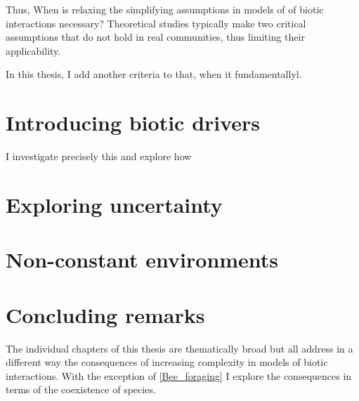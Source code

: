 \begin{refsection}
Thus, When is relaxing the simplifying assumptions in models of  of biotic interactions necessary? Theoretical studies typically make two critical assumptions that do not hold in real communities, thus limiting their applicability.


In this thesis, I add another criteria to that, when it fundamentallyl.



\section*{Introducing biotic drivers}

I investigate precisely this and explore how


\section*{ Exploring uncertainty}


\section*{Non-constant environments}



\section*{Concluding remarks}
The individual chapters of this thesis are thematically broad but all address in a different way the consequences of increasing complexity in models of biotic interactions. With the exception of \autoref{Bee_foraging} I explore the consequences in terms of the coexistence of species.


\end{refsection}
